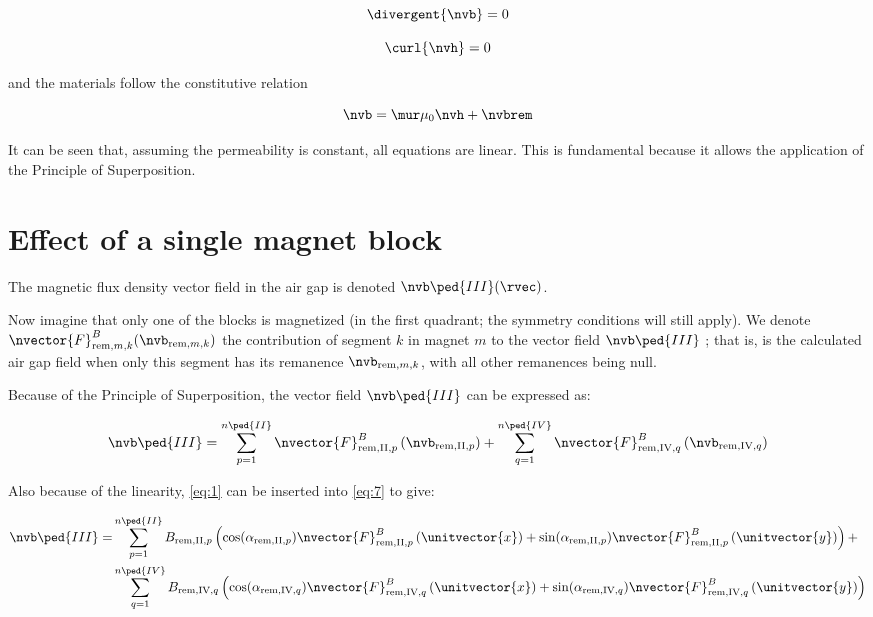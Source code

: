 \documentclass[article,brazil,english]{techreport}
\newcommand{\indexremmk}[2]{\mathrm{rem},{#1},{#2}}
\newcommand{\nvbremmk}[2]{\nvb_{\indexremmk{#1}{#2}}}
\newcommand{\bremmk}[2]{B_{\indexremmk{#1}{#2}}}
\newcommand{\alpharemmk}[2]{\alpha_{\indexremmk{#1}{#2}}}
\newcommand{\nvfremmk}[2]{\nvector{F}^B_{\indexremmk{#1}{#2}}}
\newcommand{\nvbiii}{\nvb\ped{III}}
\begin{document}
\begin{equation}
  \label{eq:4}
  \divergent{\nvb} = 0
\end{equation}

\begin{equation}
  \label{eq:5}
  \curl{\nvh} = 0
\end{equation}

\noindent and the materials follow the constitutive relation

\begin{equation}
  \label{eq:6}
  \nvb = \mur \mu_0 \nvh + \nvbrem
\end{equation}

It can be seen that, assuming the permeability is constant, all equations are linear. This is fundamental because it allows the application of the Principle of Superposition.

\section{Effect of a single magnet block}
\label{sec:effect-single-magnet}

The magnetic flux density vector field in the air gap is denoted $\nvbiii (\rvec)$.

Now imagine that only one of the blocks is magnetized (in the first quadrant; the symmetry conditions will still apply). We denote $\nvfremmk{m}{k}  (\nvbremmk{m}{k} )$ the contribution of segment $k$ in magnet $m$ to the vector field $\nvbiii$ \cite{bib:insinga16_optim}; that is, is the calculated air gap field when only this segment has its remanence $\nvbremmk{m}{k}$, with all other remanences being null.

Because of the Principle of Superposition, the vector field $\nvbiii$ can be expressed as:

\begin{equation}
  \label{eq:7}
  \nvbiii = \sum_{p=1}^{n\ped{II}} \nvfremmk{\mathrm{II}}{p} \left(\nvbremmk{\mathrm{II}}{p}\right) + \sum_{q=1}^{n\ped{IV}} \nvfremmk{\mathrm{IV}}{q} \left(\nvbremmk{\mathrm{IV}}{q}\right)
\end{equation}

Also because of the linearity, \autoref{eq:1} can be inserted into \autoref{eq:7} to give:

\begin{equation}
\begin{split}
    \nvbiii = &\sum_{p=1}^{n\ped{II}} \bremmk{\mathrm{II}}{p} \left( \cos(\alpharemmk{\mathrm{II}}{p}) \nvfremmk{\mathrm{II}}{p} \left(\unitvector{x}\right) + \sin(\alpharemmk{\mathrm{II}}{p}) \nvfremmk{\mathrm{II}}{p} \left(\unitvector{y}\right) \right) + \\ 
&\sum_{q=1}^{n\ped{IV}} \bremmk{\mathrm{IV}}{q} \left( \cos(\alpharemmk{\mathrm{IV}}{q}) \nvfremmk{\mathrm{IV}}{q} \left(\unitvector{x}\right) + \sin(\alpharemmk{\mathrm{IV}}{q}) \nvfremmk{\mathrm{IV}}{q} \left(\unitvector{y}\right) \right) 
\end{split}
  \label{eq:8}
\end{equation}
\end{document}

